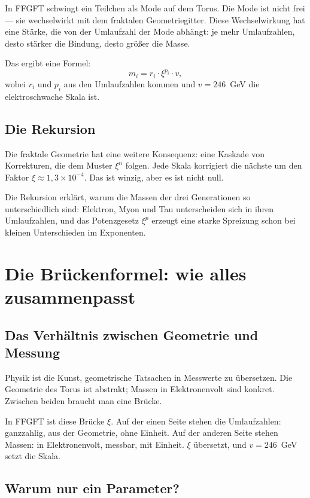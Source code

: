 \documentclass[12pt,oneside]{book}
\begin{document}
In FFGFT schwingt ein Teilchen als Mode auf dem Torus. Die Mode ist nicht frei — sie wechselwirkt mit dem fraktalen Geometriegitter. Diese Wechselwirkung hat eine Stärke, die von der Umlaufzahl der Mode abhängt: je mehr Um\-lauf\-zahlen, desto stärker die Bindung, desto größer die Masse.

Das ergibt eine Formel:
\[
m_i = r_i \cdot \xi^{p_i} \cdot v,
\]
wobei $r_i$ und $p_i$ aus den Um\-lauf\-zahlen kommen und $v = 246$~GeV die elektroschwache Skala ist.

\section{Die Rekursion}

Die fraktale Geometrie hat eine weitere Konsequenz: eine Kaskade von Korrekturen, die dem Muster $\xi^n$ folgen. Jede Skala korrigiert die nächste um den Faktor $\xi \approx 1{,}3 \times 10^{-4}$. Das ist winzig, aber es ist nicht null.

Die Rekursion erklärt, warum die Massen der drei Generationen so unterschiedlich sind: Elektron, Myon und Tau unterscheiden sich in ihren Um\-lauf\-zahlen, und das Potenzgesetz $\xi^p$ erzeugt eine starke Spreizung schon bei kleinen Unterschieden im Exponenten.

\chapter{Die Brückenformel: wie alles zusammenpasst}

\section{Das Verhältnis zwischen Geometrie und Messung}

Physik ist die Kunst, geometrische Tatsachen in Messwerte zu übersetzen. Die Geometrie des Torus ist abstrakt; Massen in Elektronenvolt sind konkret. Zwischen beiden braucht man eine Brücke.

In FFGFT ist diese Brücke $\xi$. Auf der einen Seite stehen die Um\-lauf\-zahlen: ganzzahlig, aus der Geometrie, ohne Einheit. Auf der anderen Seite stehen Massen: in Elektronenvolt, messbar, mit Einheit. $\xi$ übersetzt, und $v = 246$~GeV setzt die Skala.

\section{Warum nur ein Parameter?}
\end{document}
